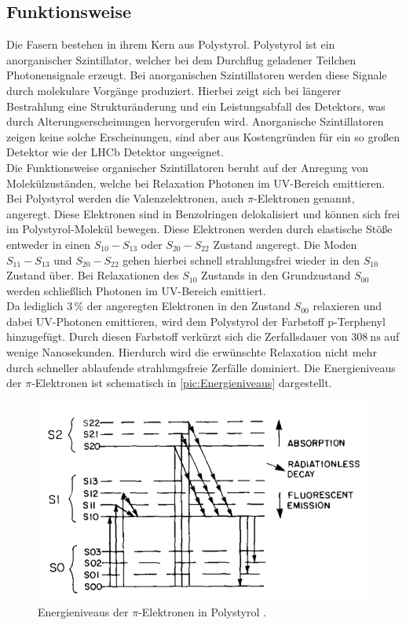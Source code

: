 \subsection{Funktionsweise}

Die Fasern bestehen in ihrem Kern aus Polystyrol. Polystyrol ist ein anorganischer Szintillator, welcher bei dem 
Durchflug geladener Teilchen Photonensignale erzeugt. Bei anorganischen Szintillatoren werden diese Signale durch
molekulare Vorgänge produziert. Hierbei zeigt sich bei längerer Bestrahlung eine Strukturänderung und ein Leistungsabfall des
Detektors, was durch Alterungserscheinungen hervorgerufen wird. Anorganische Szintillatoren zeigen keine solche Erscheinungen,
sind aber aus Kostengründen für ein so großen Detektor wie der LHCb Detektor ungeeignet.\\
Die Funktionsweise organischer Szintillatoren beruht auf der Anregung von Molekülzuständen, welche bei Relaxation
Photonen im UV-Bereich emittieren. Bei Polystyrol werden die Valenzelektronen, auch $\pi$-Elektronen genannt, angeregt.
Diese Elektronen sind in Benzolringen delokalisiert und können sich frei im Polystyrol-Molekül bewegen. Diese Elektronen
werden durch elastische Stöße entweder in einen $S_{10} - S_{13}$ oder $S_{20} - S_{22}$ Zustand angeregt. Die Moden $S_{11} - S_{13}$ und $S_{20} - S_{22}$
gehen hierbei schnell strahlungsfrei wieder in den $S_{10}$ Zustand über. Bei Relaxationen des $S_{10}$ Zustands in den 
Grundzustand $S_{00}$ werden schließlich Photonen im UV-Bereich emittiert.\\
Da lediglich $3 \, \%$ der angeregten Elektronen in den Zustand $S_{00}$ relaxieren und dabei UV-Photonen
emittieren, wird dem Polystyrol der Farbstoff p-Terphenyl hinzugefügt. Durch diesen Farbstoff verkürzt sich die Zerfallsdauer
von $\qty{308}{\nano\second}$ auf wenige Nanosekunden. Hierdurch wird die erwünschte Relaxation nicht mehr durch 
schneller ablaufende strahlungsfreie Zerfälle dominiert. Die Energieniveaus der $\pi$-Elektronen ist schematisch in 
\autoref{pic:Energieniveaus} dargestellt.\\
\begin{figure}
    \centering
    \includegraphics[width = .8\textwidth]{content/pics/Energieniveaus.png}
    \caption{Energieniveaus der $\pi$-Elektronen in Polystyrol \cite{SciFi_Versuch}.}
    \label{pic:Energieniveaus}
\end{figure}
